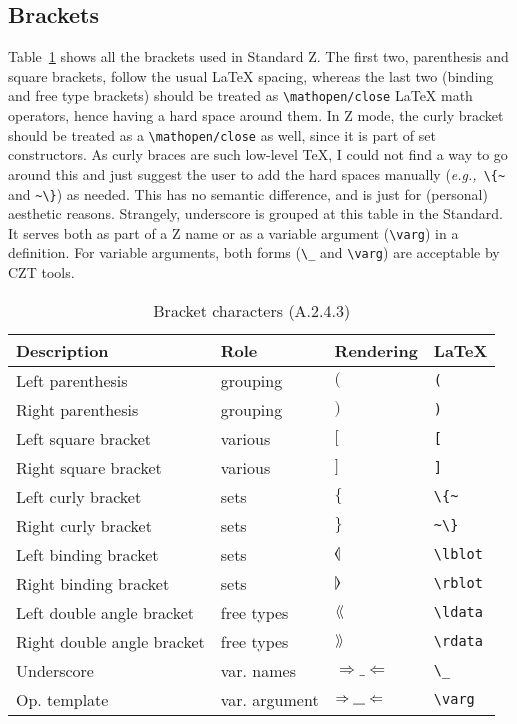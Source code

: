 \documentclass{article}
\newcommand{\smallcaption}[1]{{\small (#1)}}
\begin{document}
\subsection{Brackets}\label{sec:special-bracket}

Table~\ref{tbl:special-bracket} shows all the brackets used in Standard Z.
The first two, parenthesis and square brackets, follow the usual \LaTeX{}
spacing, whereas the last two (binding and free type brackets) should be
treated as \verb|\mathopen/close| \LaTeX{} math operators, hence having a
hard space around them. In Z mode, the curly bracket should be treated as
a \verb|\mathopen/close| as well, since it is part of set constructors.
As curly braces are such low-level \TeX{}, I could not find a way to go
around this and just suggest the user to add the hard spaces manually
(\textit{e.g.,}~\verb|\{~| and \verb|~\}|) as needed. This has no semantic
difference, and is just for (personal) aesthetic reasons. Strangely,
underscore is grouped at this table in the Standard. It serves both as part of
a Z name or as a variable argument (\verb|\varg|) in a definition. For variable
arguments, both forms (\verb|\_| and \verb|\varg|) are acceptable by CZT tools.
%
\begin{table}[ht]
\centering
\begin{tabular}{|l|l|l|l|}
   \hline
   \textbf{Description}       & \textbf{Role} & \textbf{Rendering} & \textbf{\LaTeX} \\
   \hline
   Left parenthesis           & grouping   & $($ & \verb|(| \\
   \hline
   Right parenthesis          & grouping   & $)$ & \verb|)| \\
   \hline
   Left square bracket        & various    & $[$ & \verb|[| \\
   \hline
   Right square bracket       & various    & $]$ & \verb|]| \\
   \hline
   Left curly bracket         & sets       & $\{$\textvisiblespace & \verb|\{~| \\
   \hline
   Right curly bracket        & sets       & \textvisiblespace$\}$ & \verb|~\}| \\
   \hline
   Left binding bracket       & sets       & $\lblot$ & \verb|\lblot| \\
   \hline
   Right binding bracket      & sets       & $\rblot$ & \verb|\rblot| \\
   \hline
   Left double angle bracket  & free types & $\langle\!\langle$& \verb|\ldata| \\
   \hline
   Right double angle bracket & free types & $\rangle\!\rangle$ & \verb|\rdata| \\
   \hline
   Underscore                 & var. names & $\Rightarrow\_\Leftarrow$ & \verb|\_| \\
   \hline
   Op. template               & var. argument & $\Rightarrow\varg\Leftarrow$ & \verb|\varg| \\
   \hline
\end{tabular}
\caption{Bracket characters \smallcaption{A.2.4.3}}\label{tbl:special-bracket}
\end{table}
\end{document}
